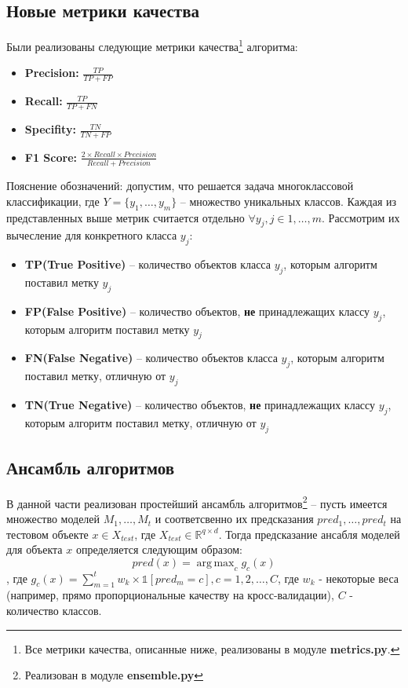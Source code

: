 \documentclass[a4paper, 11pt]{article}
\DeclareMathOperator*{\argmax}{arg\,max}
\begin{document}
       \subsection{Новые метрики качества}
            Были реализованы следующие метрики качества\footnote{Все метрики качества, описанные ниже, реализованы в модуле \textbf{metrics.py}.} алгоритма:
            \begin{itemize}
                \item \textbf{Precision:} $\frac{TP}{TP + FP}$
                \item \textbf{Recall:} $\frac{TP}{TP + FN}$
                \item \textbf{Specifity:} $\frac{TN}{TN + FP}$
                \item \textbf{F1 Score:} $\frac{2 \times Recall \times Precision}{Recall + Precision}$
            \end{itemize}
        
            Пояснение обозначений: допустим, что решается задача многоклассовой классификации, где $Y = \{y_{1}, \dots, y_{m}\}$ -- множество уникальных классов. Каждая из представленных выше метрик считается отдельно  $\forall y_{j}, j \in 1, \dots, m$. Рассмотрим их вычесление для конкретного класса $y_{j}$:
                \begin{itemize}
                    \item \textbf{TP(True Positive)} -- количество объектов класса $y_{j}$, которым алгоритм поставил метку $y_{j}$
                    \item \textbf{FP(False Positive)} -- количество объектов, \textbf{не} принадлежащих классу $y_{j}$, которым алгоритм поставил метку $y_{j}$
                    \item \textbf{FN(False Negative)} -- количество объектов класса $y_{j}$, которым алгоритм поставил метку, отличную от $y_{j}$
                    \item \textbf{TN(True Negative)} -- количество объектов, \textbf{не} принадлежащих классу $y_{j}$, которым алгоритм поставил метку, отличную от $y_{j}$
                \end{itemize}
     \subsection{Ансамбль алгоритмов}
        В данной части реализован простейший ансамбль алгоритмов\footnote{Реализован в модуле \textbf{ensemble.py}} -- пусть имеется множество моделей $M_{1}, \dots, M_{t}$ и соответсвенно их предсказания $pred_{1}, \dots, pred_{t}$  на тестовом объекте $x \in X_{test}$, где $X_{test} \in \mathbb{R}^{q\times d}$. Тогда предсказание ансабля моделей для объекта $x$ определяется следующим образом:
        \[pred(x) =\argmax_{c}{g_{c}(x)} \], где $g_{c}(x) = \sum_{m=1}^{t}w_{k} \times \mathds{1}[pred_{m}=c], c=1, 2, \dots, C$, где $w_{k}$ - некоторые веса (например, прямо пропорциональные качеству на кросс-валидации), $C$ - количество классов.
        
\end{document}
